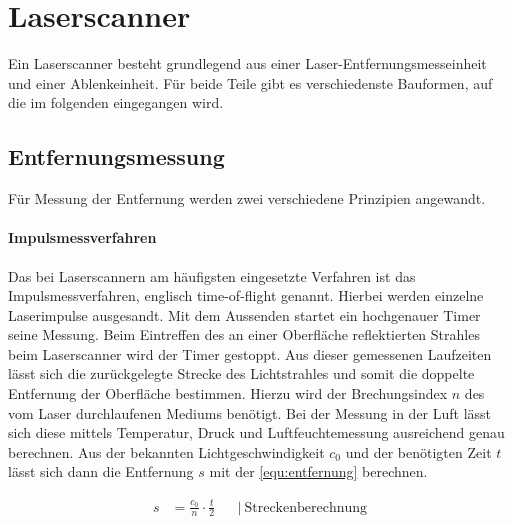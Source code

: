 \documentclass[a4paper,12pt,bibliography=totoc, listof=totoc,titlepage,pointlessnumbers]{scrreprt}
\begin{document}
\section{Laserscanner}
Ein Laserscanner besteht grundlegend aus einer Laser-Entfernungsmesseinheit und einer Ablenkeinheit. Für beide Teile gibt es verschiedenste Bauformen, auf die im folgenden eingegangen wird.

\subsection{Entfernungsmessung}
Für Messung der Entfernung werden zwei verschiedene Prinzipien angewandt.

\paragraph{Impulsmessverfahren}
\label{p:tof}
Das bei Laserscannern am häufigsten eingesetzte Verfahren ist das Impulsmessverfahren, englisch time-of-flight genannt. Hierbei werden einzelne Laserimpulse ausgesandt. Mit dem Aussenden startet ein hochgenauer Timer seine Messung. Beim Eintreffen des an einer Oberfläche reflektierten Strahles beim Laserscanner wird der Timer gestoppt. Aus dieser gemessenen Laufzeiten lässt sich die zurückgelegte Strecke des Lichtstrahles und somit die doppelte Entfernung der Oberfläche bestimmen. Hierzu wird der Brechungsindex \(n\) des vom Laser durchlaufenen Mediums benötigt. Bei der Messung in der Luft lässt sich diese mittels Temperatur, Druck und Luftfeuchtemessung ausreichend genau berechnen. Aus der bekannten Lichtgeschwindigkeit \(c_0\) und der benötigten Zeit \(t\) lässt sich dann die Entfernung \(s\) mit der \autoref{equ:entfernung} berechnen.

\begin{equation}
\begin{aligned}
s &=  \frac{c_0}{n} \cdot \frac{t}{2}  && \left|\  \text{Streckenberechnung} \right. \\
\end{aligned}
\label{equ:entfernung}
\end{equation}
\end{document}
